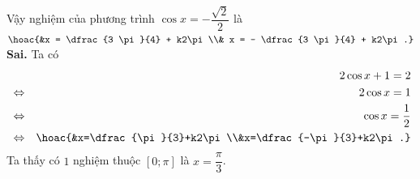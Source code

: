 \begin{ex}
{\begin{itemchoice}
   Vậy nghiệm của phương trình $\cos x = -\dfrac{\sqrt{2}}{2}$ là $\hoac{&x = \dfrac{3 \pi}{4}  + k2\pi \\& x = - \dfrac{3 \pi}{4} + k2\pi.}$
   \itemch \textbf{Sai.}  Ta có
   \begin{eqnarray*}
    & & 2\cos x + 1  = 2 \\
    &\Leftrightarrow & 2\cos x = 1  \\
    &\Leftrightarrow & \cos x = \dfrac{1}{2}\\ 
    &\Leftrightarrow & \hoac{&x=\dfrac{\pi}{3}+k2\pi\\&x=\dfrac{-\pi}{3}+k2\pi.} 
   \end{eqnarray*}
   Ta thấy có $1$  nghiệm thuộc $[0;\pi]$ là $x=\dfrac{\pi}{3}$.
 \end{itemchoice}}
\end{ex}
